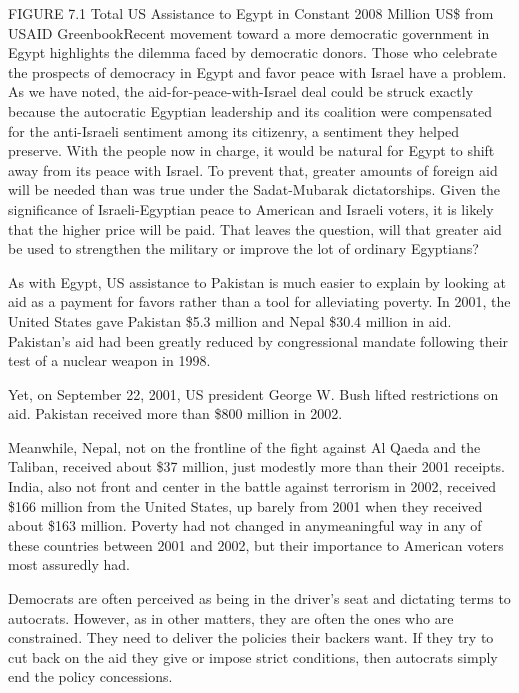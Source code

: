 \documentclass[10pt]{article}
\begin{document}
{\large FIGURE 7.1 Total US Assistance to Egypt in Constant 2008 Million US\$
from USAID GreenbookRecent movement toward a more democratic government in Egypt
highlights the dilemma faced by democratic donors. Those who celebrate the
prospects of democracy in Egypt and favor peace with Israel have a problem. As we
have noted, the aid-for-peace-with-Israel deal could be struck exactly because
the autocratic Egyptian leadership and its coalition were compensated for the
anti-Israeli sentiment among its citizenry, a sentiment they helped preserve.
With the people now in charge, it would be natural for Egypt to shift away from
its peace with Israel. To prevent that, greater amounts of foreign aid will be
needed than was true under the Sadat-Mubarak dictatorships. Given the
significance of Israeli-Egyptian peace to American and Israeli voters, it is
likely that the higher price will be paid. That leaves the question, will that
greater aid be used to strengthen the military or improve the lot of ordinary
Egyptians?}

{\large As with Egypt, US assistance to Pakistan is much easier to explain by
looking at aid as a payment for favors rather than a tool for alleviating
poverty. In 2001, the United States gave Pakistan \$5.3 million and Nepal \$30.4
million in aid. Pakistan's aid had been greatly reduced by congressional mandate
following their test of a nuclear weapon in 1998.}

{\large Yet, on September 22, 2001, US president George W. Bush lifted
restrictions on aid. Pakistan received more than \$800 million in 2002.}

{\large Meanwhile, Nepal, not on the frontline of the fight against Al Qaeda and
the Taliban, received about \$37 million, just modestly more than their 2001
receipts. India, also not front and center in the battle against terrorism in
2002, received \$166 million from the United States, up barely from 2001 when
they received about \$163 million. Poverty had not changed in anymeaningful way
in any of these countries between 2001 and 2002, but their importance to American
voters most assuredly had.}

{\large Democrats are often perceived as being in the driver's seat and
dictating terms to autocrats. However, as in other matters, they are often the
ones who are constrained. They need to deliver the policies their backers want.
If they try to cut back on the aid they give or impose strict conditions, then
autocrats simply end the policy concessions.}
\end{document}
